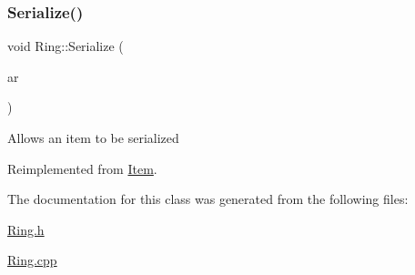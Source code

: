 \subsubsection{\texorpdfstring{Serialize()}{Serialize()}}
{\footnotesize\ttfamily void Ring\+::\+Serialize (\begin{DoxyParamCaption}\item[{C\+Archive \&}]{ar }\end{DoxyParamCaption})\hspace{0.3cm}{\ttfamily [virtual]}}

Allows an item to be serialized 

Reimplemented from \hyperlink{class_item_ad1eae21e57fc3ce3252080a4efbfb8e8}{Item}.



The documentation for this class was generated from the following files\+:\begin{DoxyCompactItemize}
\item 
\hyperlink{_ring_8h}{Ring.\+h}\item 
\hyperlink{_ring_8cpp}{Ring.\+cpp}\end{DoxyCompactItemize}
